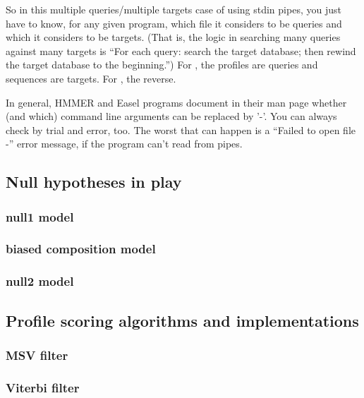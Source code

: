 
So in this multiple queries/multiple targets case of using stdin
pipes, you just have to know, for any given program, which file it
considers to be queries and which it considers to be targets. (That
is, the logic in searching many queries against many targets is ``For
each query: search the target database; then rewind the target
database to the beginning.'') For , the profiles are
queries and sequences are targets. For , the reverse.

In general, HMMER and Easel programs document in their man page
whether (and which) command line arguments can be replaced by '-'.
You can always check by trial and error, too. The worst that can
happen is a ``Failed to open file -'' error message, if the program
can't read from pipes.



\subsection{Null hypotheses in play}

\subsubsection{null1 model}

\subsubsection{biased composition model}

\subsubsection{null2 model}


\subsection{Profile scoring algorithms and implementations}

\subsubsection{MSV filter}

\subsubsection{Viterbi filter}

